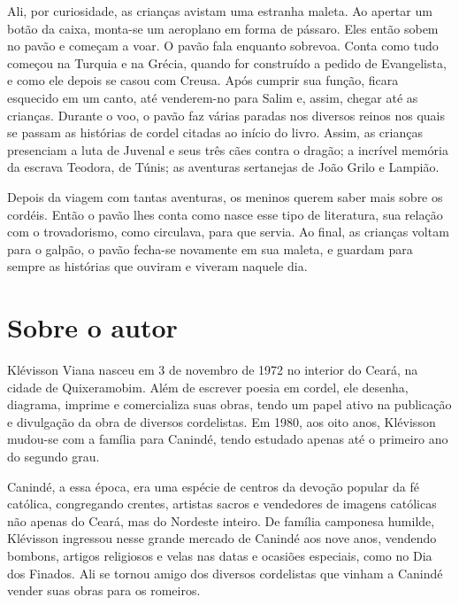 \documentclass[11pt]{extarticle}
\begin{document}
Ali, por curiosidade, as crianças avistam uma estranha maleta. Ao apertar um botão da caixa, monta-se um aeroplano em forma de pássaro. Eles então sobem no pavão e começam a voar. O pavão fala enquanto sobrevoa. Conta como tudo começou na Turquia e na Grécia, quando for construído a pedido de Evangelista, e como ele depois se casou com Creusa. Após cumprir sua função, ficara esquecido em um canto, até venderem-no para Salim e, assim, chegar até as crianças. Durante o voo, o pavão faz várias paradas nos diversos reinos nos quais se passam as histórias de cordel citadas ao início do livro. Assim, as crianças presenciam a luta de Juvenal e seus três cães contra o dragão; a incrível memória da escrava Teodora, de Túnis; as aventuras sertanejas de João Grilo e Lampião.

Depois da viagem com tantas aventuras, os meninos querem saber mais sobre os cordéis. Então o pavão lhes conta como nasce esse tipo de literatura, sua relação com o trovadorismo, como circulava, para que servia. Ao final, as crianças voltam para o galpão, o pavão fecha-se novamente em sua maleta, e guardam para sempre as histórias que ouviram e viveram naquele dia.


\reversemarginpar
\marginparwidth=5cm



\section{Sobre o autor}


Klévisson Viana nasceu em 3 de novembro de 1972 no interior do Ceará, na cidade de Quixeramobim. Além de escrever poesia em cordel, ele desenha, diagrama, imprime e comercializa suas obras, tendo um papel ativo na publicação e divulgação da obra de diversos cordelistas. Em 1980, aos oito anos, Klévisson mudou-se com a família para Canindé, tendo estudado apenas até o primeiro ano do segundo grau.

Canindé, a essa época, era uma espécie de centros da devoção popular da fé católica, congregando crentes, artistas sacros e vendedores de imagens católicas não
apenas do Ceará, mas do Nordeste inteiro. De família camponesa humilde, Klévisson ingressou nesse grande mercado de Canindé aos nove anos, vendendo bombons, artigos religiosos e velas nas datas e ocasiões especiais, como no Dia dos Finados.
Ali se tornou amigo dos diversos cordelistas que vinham a Canindé vender suas obras para os romeiros.
\end{document}

